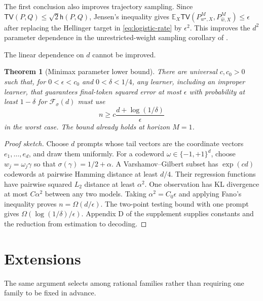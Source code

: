 \documentclass[twoside]{article}
\newtheorem{theorem}{Theorem}
\newcommand{\E}{\mathbb E}
\newcommand{\h}{\mathsf h}
\newcommand{\TV}{\mathsf{TV}}
\begin{document}
The first conclusion also improves trajectory sampling. Since $\TV(P,Q)\leq\sqrt{2}\h(P,Q)$, Jensen's inequality gives $\E_X\TV(P^M_{w^\star,X},P^M_{\widehat w,X})\leq\epsilon$ after replacing the Hellinger target in \eqref{eq:logistic-rate} by $\epsilon^2$. This improves the $d^2$ parameter dependence in the unrestricted-weight sampling corollary of \citet{doron2026stochastic}.

The linear dependence on $d$ cannot be improved.

\begin{theorem}[Minimax parameter lower bound]
\label{thm:lower}
There are universal $c,c_0>0$ such that, for $0<\epsilon<c_0$ and $0<\delta<1/4$, any learner, including an improper learner, that guarantees final-token squared error at most $\epsilon$ with probability at least $1-\delta$ for $\mathcal F_\sigma(d)$ must use
\begin{equation}
 n\geq c\frac{d+\log(1/\delta)}{\epsilon}
 \label{eq:lower-rate}
\end{equation}
in the worst case. The bound already holds at horizon $M=1$.
\end{theorem}

\begin{proof}[Proof sketch]
Choose $d$ prompts whose tail vectors are the coordinate vectors $e_1,\ldots,e_d$, and draw them uniformly. For a codeword $\omega\in\{-1,+1\}^d$, choose $w_j=\omega_j\gamma$ so that $\sigma(\gamma)=1/2+\alpha$. A Varshamov--Gilbert subset has $\exp(cd)$ codewords at pairwise Hamming distance at least $d/4$. Their regression functions have pairwise squared $L_2$ distance at least $\alpha^2$. One observation has KL divergence at most $C\alpha^2$ between any two models. Taking $\alpha^2=C_0\epsilon$ and applying Fano's inequality \citep[Chapter 2]{tsybakov2009} proves $n=\Omega(d/\epsilon)$. The two-point testing bound with one prompt gives $\Omega(\log(1/\delta)/\epsilon)$. Appendix D of the supplement supplies constants and the reduction from estimation to decoding.
\end{proof}

\section{Extensions}
\label{sec:extensions}

The same argument selects among rational families rather than requiring one family to be fixed in advance.
\end{document}

